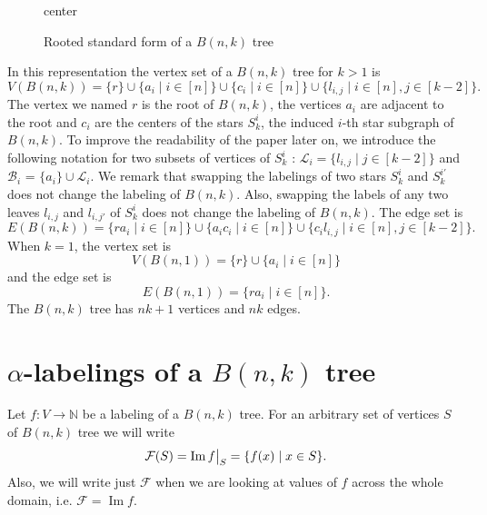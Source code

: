 \documentclass[10pt]{article}
\theoremstyle{definition}
\DeclareMathOperator{\Ima}{Im}
\newcommand{\littletaller}{\mathchoice{\vphantom{\big|}}{}{}{}} %
\newcommand\restr[2]{{%
    \left.\kern-\nulldelimiterspace %
    #1 %
    \littletaller %
    \right|_{#2} %
}}
\begin{document}
\begin{figure}[H]
\begin{adjustbox}{center}
  \end{adjustbox}

  \caption{Rooted standard form of a $B(n, k)$ tree}
  \label{fig:rsf-banana-tree}
\end{figure}
In this representation the vertex set of a $B(n, k )$ tree for $k > 1$ is
$$
V(B(n,k)) = \{r\} \cup \{ a_i \mid i \in [n]\} \cup \{c_i \mid i \in [n] \} \cup \{l_{i,j} \mid i \in [n], j \in [k-2] \}.
$$
The vertex we named $r$ is the root of $B(n,k)$, the vertices $a_i$ are adjacent to the root and $c_i$ are the centers of the stars $S^i_k$, the induced $i$-th star subgraph of $B(n, k)$. To improve the readability of the paper later on, we introduce the following notation for two subsets of vertices of $S^i_k$ : $\mathcal{L}_i = \{l_{i,j} \mid j \in [k-2] \}$ and $\mathcal{B}_i$ = $\{a_i\} \cup \mathcal{L}_i$. We remark that swapping the labelings of two stars $S^i_k$ and $S^{i'}_k$ does not change the labeling of $B(n,k)$. Also, swapping the labels of any two leaves $l_{i, j}$ and $l_{i, j'}$ of $S^i_k$ does not change the labeling of $B(n,k)$. The edge set is
$$
E(B(n,k)) = \{r a_i \mid i \in [n]\} \cup \{a_i c_i \mid i \in [n]\} \cup \{c_i l_{i,j} \mid i \in [n], j \in [k-2]\}.
$$
When $k = 1$, the vertex set is
$$
V(B(n,1)) = \{r\} \cup \{ a_i \mid i \in [n]\}
$$
and the edge set is
$$
E(B(n,1)) = \{r a_i \mid i \in [n]\}.
$$
The $B(n, k)$ tree has $n k + 1$ vertices and $n k$ edges.

\section{\texorpdfstring{$\alpha$}{Alpha}-labelings of a \texorpdfstring{$B(n,k)$}{B(n,k)} tree}
Let $f : V \rightarrow \mathbb{N}$ be a labeling of a $B(n, k)$ tree. For an arbitrary set of vertices $S$ of $B(n, k)$ tree we will write
$$
\mathcal{F}(S) = \Ima \restr{f}{S} = \{f(x) \mid x \in S\}.
$$
Also, we will write just $\mathcal{F}$ when we are looking at values of $f$ across the whole domain, i.e. $\mathcal{F} = \Ima f$.
\end{document}
